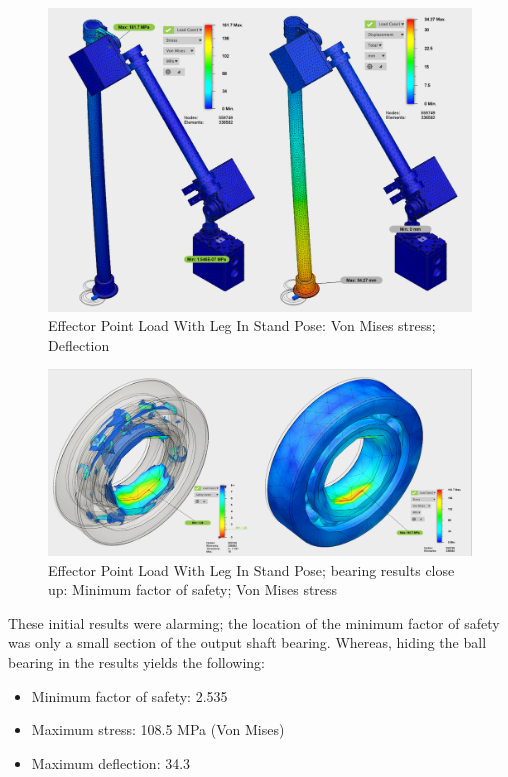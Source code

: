 \begin{figure}[h]
\centering
\includegraphics[width=1.0\columnwidth]{./img/aquaShoko-v3dot3-FEA-WithBearing-2.png}
\caption{Effector Point Load With Leg In Stand Pose: Von Mises stress; Deflection}
\label{fig:test two pressure check}
\end{figure}

\begin{figure}[h]
\centering
\includegraphics[width=1.0\columnwidth]{./img/aquaShoko-v3dot3-FEA-bearingOnly.png}
\caption{Effector Point Load With Leg In Stand Pose; bearing results close up: Minimum factor of safety; Von Mises stress}
\label{fig:test two pressure check}
\end{figure}







These initial results were alarming; the location of the minimum factor of safety was only a small section of the output shaft bearing. Whereas, hiding the ball bearing in the results yields the following:
  \begin{itemize}
     \item Minimum factor of safety: 2.535
     \item Maximum stress: 108.5 MPa (Von Mises)
     \item Maximum deflection: 34.3
 \end{itemize}



